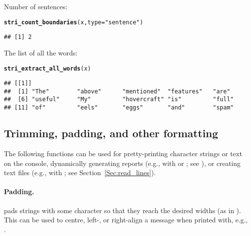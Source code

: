 \documentclass[nojss]{jss}\usepackage[]{graphicx}\usepackage[]{xcolor}
\makeatletter
\newcommand{\hlstr}[1]{\textcolor[rgb]{0.192,0.494,0.8}{#1}}%
\newcommand{\hlstd}[1]{\textcolor[rgb]{0.345,0.345,0.345}{#1}}%
\newcommand{\hlkwc}[1]{\textcolor[rgb]{0.333,0.667,0.333}{#1}}%
\newcommand{\hlkwd}[1]{\textcolor[rgb]{0.737,0.353,0.396}{\textbf{#1}}}%
\newenvironment{kframe}{%
 \def\at@end@of@kframe{}%
 \ifinner\ifhmode%
  \def\at@end@of@kframe{\end{minipage}}%
  \begin{minipage}{\columnwidth}%
 \fi\fi%
 \def\FrameCommand##1{\hskip\@totalleftmargin \hskip-\fboxsep
 \colorbox{shadecolor}{##1}\hskip-\fboxsep
     \hskip-\linewidth \hskip-\@totalleftmargin \hskip\columnwidth}%
 \MakeFramed {\advance\hsize-\width
   \@totalleftmargin\z@ \linewidth\hsize
   \@setminipage}}%
 {\par\unskip\endMakeFramed%
 \at@end@of@kframe}
\newenvironment{knitrout}{}{} %
\makeatother
\begin{document}
Number of sentences:

\begin{knitrout}
\color{fgcolor}\begin{kframe}
\begin{alltt}
\hlkwd{stri_count_boundaries}\hlstd{(x,} \hlkwc{type}\hlstd{=}\hlstr{"sentence"}\hlstd{)}
\end{alltt}
\begin{verbatim}
## [1] 2
\end{verbatim}
\end{kframe}
\end{knitrout}

The list of all the words:

\begin{knitrout}
\color{fgcolor}\begin{kframe}
\begin{alltt}
\hlkwd{stri_extract_all_words}\hlstd{(x)}
\end{alltt}
\begin{verbatim}
## [[1]]
##  [1] "The"        "above"      "mentioned"  "features"   "are"       
##  [6] "useful"     "My"         "hovercraft" "is"         "full"      
## [11] "of"         "eels"       "eggs"       "and"        "spam"
\end{verbatim}
\end{kframe}
\end{knitrout}





\subsection{Trimming, padding, and other formatting}

The following functions can be used for pretty-printing
character strings or text on the console,
dynamically generating reports (e.g.,
with  or ; see \citealp{knitr}),
or creating text files
(e.g., with ; see Section~\ref{Sec:read_lines}).



\paragraph{Padding.}
 pads strings with some character so that they
reach the desired widths (as in ).
This can be used to centre, left-, or right-align a message
when printed with, e.g.,  .
\end{document}
